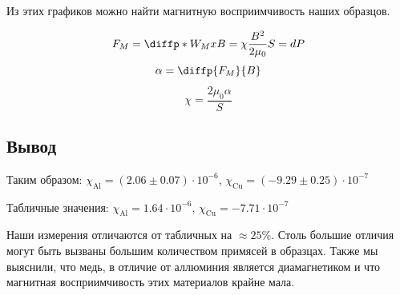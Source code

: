 \documentclass[a4paper, 12pt]{article}
\begin{document}
Из этих графиков можно найти магнитную восприимчивость наших образцов.

\begin{equation}
    F_M = \diffp*{W_M}{x}{B} = \chi \frac{B^2}{2\mu_0}S = dP
\end{equation}
\begin{equation}
    \alpha = \diffp{F_M}{B}
\end{equation}
\begin{equation}
    \chi = \frac{2\mu_0 \alpha}{S}
\end{equation}

\centering
\subsection*{Вывод}
\raggedright

Таким образом: $\chi_\text{Al} = (2.06 \pm 0.07) \cdot 10^{-6}$,
$\chi_\text{Cu} = (-9.29 \pm 0.25) \cdot 10^{-7}$

Табличные значения: $\chi_\text{Al} = 1.64 \cdot 10^{-6}$,
$\chi_\text{Cu} = -7.71 \cdot 10^{-7}$

Наши измерения отличаются от табличных на $\approx 25\%$. Столь большие отличия
могут быть вызваны большим количеством примясей в образцах. Также мы выяснили,
что медь, в отличие от аллюминия является диамагнетиком и что магнитная восприимчивость
этих материалов крайне мала.

\newpage
\end{document}
